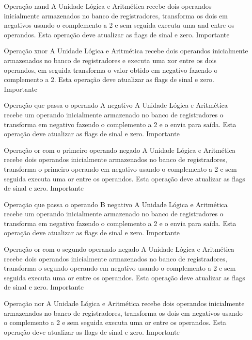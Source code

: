 \documentclass{report}
\begin{document}
\begin{functional}
      \requirement
      {Operação nand}
      {A Unidade Lógica e Aritmética recebe dois operandos inicialmente armazenados no banco de registradores, transforma os dois em negativos usando o complemento a 2 e sem seguida executa uma and entre os  operandos. Esta operação deve atualizar as flags de sinal e zero.}
      {Importante}
      
       \requirement
      {Operação xnor}
      {A Unidade Lógica e Aritmética recebe dois operandos inicialmente armazenados no banco de registradores e executa uma xor entre os dois operandos, em seguida transforma o valor obtido em negativo fazendo o complemento a 2. Esta operação deve atualizar as flags de sinal e zero.}
      {Importante}
      
      \requirement
      {Operação que passa o operando A negativo}
      {A Unidade Lógica e Aritmética recebe um operando inicialmente armazenado no banco de registradores o transforma em negativo fazendo o complemento a 2 e o envia para saída. Esta operação deve atualizar as flags de sinal e zero.}
      {Importante}
      
       \requirement
      {Operação or com o primeiro operando negado}
      {A Unidade Lógica e Aritmética recebe dois operandos inicialmente armazenados no banco de registradores, transforma o primeiro operando em negativo usando o complemento a 2 e sem seguida executa uma or entre os  operandos. Esta operação deve atualizar as flags de sinal e zero.}
      {Importante}
      
       \requirement
      {Operação que passa o operando B negativo}
      {A Unidade Lógica e Aritmética recebe um operando inicialmente armazenado no banco de registradores o transforma em negativo fazendo o complemento a 2 e o envia para saída. Esta operação deve atualizar as flags de sinal e zero.}
      {Importante}
      
       \requirement
      {Operação or com o segundo operando negado}
      {A Unidade Lógica e Aritmética recebe dois operandos inicialmente armazenados no banco de registradores, transforma o segundo operando em negativo usando o complemento a 2 e sem seguida executa uma or entre os operandos. Esta operação deve atualizar as flags de sinal e zero.}
      {Importante}
      
      \requirement
      {Operação nor}
      {A Unidade Lógica e Aritmética recebe dois operandos inicialmente armazenados no banco de registradores, transforma os dois em negativos usando o complemento a 2 e sem seguida executa uma or entre os  operandos. Esta operação deve atualizar as flags de sinal e zero.}
      {Importante}
      

\end{functional}
\end{document}
